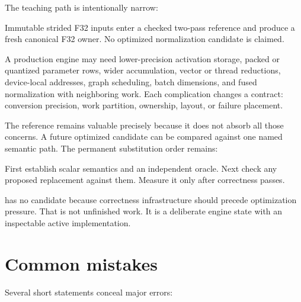 The teaching path is intentionally narrow:

Immutable strided F32 inputs enter a checked two-pass reference and produce a fresh canonical F32 owner. No optimized normalization candidate is claimed.

A production engine may need lower-precision activation storage, packed
or quantized parameter rows, wider accumulation, vector or thread
reductions, device-local addresses, graph scheduling, batch dimensions,
and fused normalization with neighboring work. Each complication changes
a contract: conversion precision, work partition, ownership, layout, or
failure placement.

The reference remains valuable precisely because it does not absorb all
those concerns. A future optimized candidate can be compared against one
named semantic path. The permanent substitution order remains:

First establish scalar semantics and an independent oracle. Next check any proposed replacement against them. Measure it only after correctness passes.

 has no candidate because correctness infrastructure should
precede optimization pressure. That is not unfinished work. It is a
deliberate engine state with an inspectable active implementation.

\section{Common mistakes}\label{common-mistakes-5}

Several short statements conceal major errors:


